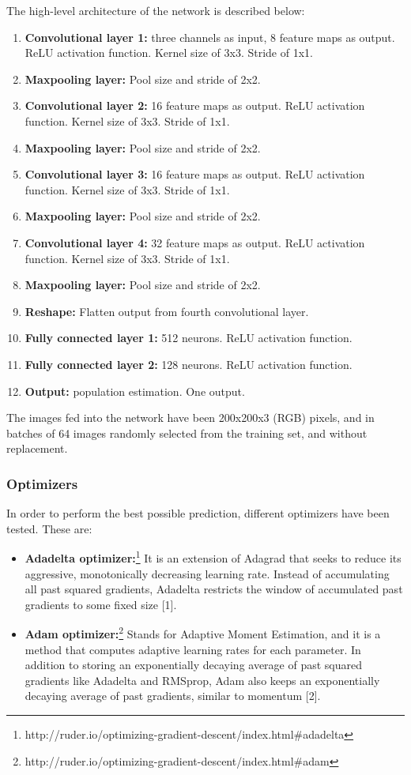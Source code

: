 \documentclass{article}
\begin{document}
 The high-level architecture of the network is described below:
 \begin{enumerate}
\item \textbf{Convolutional layer 1:} three channels as input, 8 feature maps as output. ReLU activation function. Kernel size of 3x3. Stride of 1x1.
\item \textbf{Maxpooling layer:} Pool size and stride of 2x2.
\item \textbf{Convolutional layer 2:} 16 feature maps as output. ReLU activation function. Kernel size of 3x3. Stride of 1x1.
\item \textbf{Maxpooling layer:} Pool size and stride of 2x2.
\item \textbf{Convolutional layer 3:} 16 feature maps as output. ReLU activation function. Kernel size of 3x3. Stride of 1x1.
\item \textbf{Maxpooling layer:} Pool size and stride of 2x2.
\item \textbf{Convolutional layer 4:} 32 feature maps as output. ReLU activation function. Kernel size of 3x3. Stride of 1x1.
\item \textbf{Maxpooling layer:} Pool size and stride of 2x2.
\item \textbf{Reshape:} Flatten output from fourth convolutional layer.
\item \textbf{Fully connected layer 1:} 512 neurons. ReLU activation function.
\item \textbf{Fully connected layer 2:} 128 neurons. ReLU activation function.
\item \textbf{Output:} population estimation. One output.
 \end{enumerate}

The images fed into the network have been 200x200x3 (RGB) pixels, and in batches of 64 images randomly selected from the training set, and without replacement.
 
\subsubsection{Optimizers}
In order to perform the best possible prediction, different optimizers have been tested. These are:
\begin{itemize}
\item \textbf{Adadelta optimizer:}\footnote{http://ruder.io/optimizing-gradient-descent/index.html\#adadelta} It is an extension of Adagrad that seeks to reduce its aggressive, monotonically decreasing learning rate. Instead of accumulating all past squared gradients, Adadelta restricts the window of accumulated past gradients to some fixed size [1].
\item \textbf{Adam optimizer:}\footnote{http://ruder.io/optimizing-gradient-descent/index.html\#adam}
 Stands for Adaptive Moment Estimation, and it is a method that computes adaptive learning rates for each parameter. In addition to storing an exponentially decaying average of past squared gradients like Adadelta and RMSprop, Adam also keeps an exponentially decaying average of past gradients, similar to momentum [2].
\end{itemize}
\end{document}
